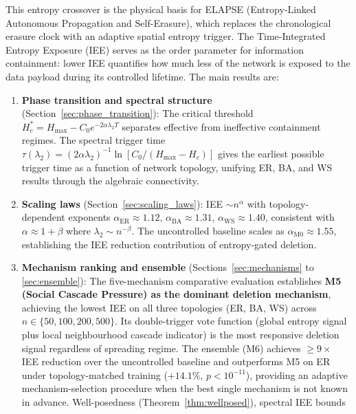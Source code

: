 \documentclass[review,12pt]{elsarticle}
\newcommand{\Hc}{H_c}
\newcommand{\Hmax}{H_{\max}}
\begin{document}
This entropy crossover is the physical basis for ELAPSE
(Entropy-Linked Autonomous Propagation and Self-Erasure), which replaces
the chronological erasure clock with an adaptive spatial entropy trigger.
The Time-Integrated Entropy Exposure (IEE) serves as the order parameter
for information containment: lower IEE quantifies how much less of the
network is exposed to the data payload during its controlled lifetime.
The main results are:

\begin{enumerate}
  \item \textbf{Phase transition and spectral structure}
        (Section~\ref{sec:phase_transition}):
        The critical threshold $\Hc^* = \Hmax - C_0 e^{-2\alpha\lambda_2 T}$
        separates effective from ineffective containment regimes.
        The spectral trigger time $\tau(\lambda_2) = (2\alpha\lambda_2)^{-1}
        \ln[C_0/(\Hmax - \Hc)]$ gives the earliest possible trigger time
        as a function of network topology, unifying ER, BA, and WS results
        through the algebraic connectivity.
  \item \textbf{Scaling laws}
        (Section~\ref{sec:scaling_laws}):
        IEE $\sim n^\alpha$ with topology-dependent exponents
        $\alpha_{\mathrm{ER}} \approx 1.12$,
        $\alpha_{\mathrm{BA}} \approx 1.31$,
        $\alpha_{\mathrm{WS}} \approx 1.40$, consistent with
        $\alpha \approx 1 + \beta$ where $\lambda_2 \sim n^{-\beta}$.
        The uncontrolled baseline scales as $\alpha_{\mathrm{M0}} \approx 1.55$,
        establishing the IEE reduction contribution of entropy-gated deletion.
  \item \textbf{Mechanism ranking and ensemble}
        (Sections~\ref{sec:mechanisms} to \ref{sec:ensemble}):
        The five-mechanism comparative evaluation establishes \textbf{M5
        (Social Cascade Pressure) as the dominant deletion mechanism},
        achieving the lowest IEE on all three topologies (ER, BA, WS) across
        $n \in \{50, 100, 200, 500\}$.  Its double-trigger vote function
        (global entropy signal plus local neighbourhood cascade indicator)
        is the most responsive deletion signal regardless of spreading regime.
        The ensemble (M6) achieves $\geq 9\times$ IEE reduction over the
        uncontrolled baseline and outperforms M5 on ER under topology-matched
        training ($+14.1\%$, $p < 10^{-11}$), providing an adaptive
        mechanism-selection procedure when the best single mechanism is not
        known in advance.
        Well-posedness (Theorem~\ref{thm:wellposed}), spectral IEE bounds

\end{enumerate}
\end{document}
